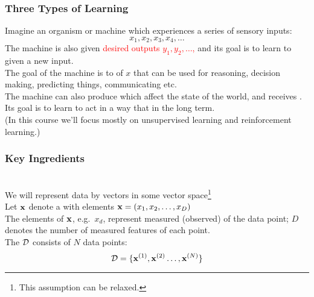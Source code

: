 \begin{frame}
\frametitle{Three Types of Learning}

Imagine an organism or machine which experiences a series of sensory inputs: 
%
\[
x_1, x_2, x_3, x_4, \ldots
\] 
%
 The machine is also given
\textcolor{red}{desired outputs $y_1, y_2, \ldots$,} and its goal is
to learn to  given a new
input. \\[1.5ex]

 The goal of the machine is to  of $x$ that can be used for reasoning, decision
making, predicting things, communicating etc. \\[1.5ex]

 The machine can also produce  which affect the state of the world, and receives . Its goal is to learn to act in a
way that  in the long term.  \\[2ex]

(In this course we'll focus mostly on unsupervised learning and
reinforcement learning.)


\end{frame}
\begin{frame}
\frametitle{Key Ingredients}

 \\[1ex]

We will represent data by vectors in some vector space\footnote{This
assumption can be relaxed.}\\[1ex]

Let $\mathbf x$ denote a  with elements $\mathbf x=(x_1, x_2, \ldots,
x_D)$\\[1ex] 

The elements of $\mathbf x$, e.g.\ $x_d$, represent measured (observed)
 of the data point; $D$ denotes the number of measured
features of each point. \\[1ex]

The  $\mathcal{D}$ consists of $N$ data points:
\[
\mathcal{D} = \{ \mathbf x^{(1)}, \mathbf x^{(2)} \ldots, \mathbf x^{(N)} \}
\]

\end{frame}
